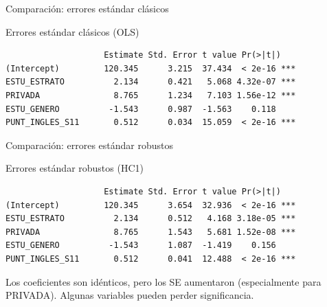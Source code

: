 \documentclass[aspectratio=169, 11pt]{beamer}
\begin{document}
\begin{frame}[fragile]{Comparación: errores estándar clásicos}
\begin{exampleblock}{Errores estándar clásicos (OLS)}
\small
\begin{verbatim}
                    Estimate Std. Error t value Pr(>|t|)
(Intercept)         120.345      3.215  37.434  < 2e-16 ***
ESTU_ESTRATO          2.134      0.421   5.068 4.32e-07 ***
PRIVADA               8.765      1.234   7.103 1.56e-12 ***
ESTU_GENERO          -1.543      0.987  -1.563    0.118
PUNT_INGLES_S11       0.512      0.034  15.059  < 2e-16 ***
\end{verbatim}
\end{exampleblock}
\end{frame}

\begin{frame}[fragile]{Comparación: errores estándar robustos}
\begin{exampleblock}{Errores estándar robustos (HC1)}
\small
\begin{verbatim}
                    Estimate Std. Error t value Pr(>|t|)
(Intercept)         120.345      3.654  32.936  < 2e-16 ***
ESTU_ESTRATO          2.134      0.512   4.168 3.18e-05 ***
PRIVADA               8.765      1.543   5.681 1.52e-08 ***
ESTU_GENERO          -1.543      1.087  -1.419    0.156
PUNT_INGLES_S11       0.512      0.041  12.488  < 2e-16 ***
\end{verbatim}
\end{exampleblock}

\vspace{0.3cm}
Los coeficientes son idénticos, pero los SE aumentaron (especialmente para PRIVADA). Algunas variables pueden perder significancia.
\end{frame}
\end{document}
